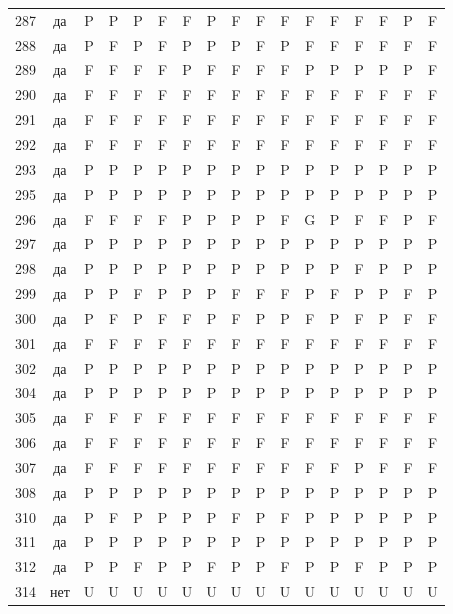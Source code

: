 \begin{table}[p]
\begin{tabular*}{\textwidth}{@{\extracolsep{\fill}}rcccccccccccccccc}
287 & да & P & P & P & F & F & P & F & F & F & F & F & F & F & P & F\\
288 & да & P & F & P & F & P & P & P & F & P & F & F & F & F & F & F\\
289 & да & F & F & F & F & P & F & F & F & F & P & P & P & P & P & F\\
290 & да & F & F & F & F & F & F & F & F & F & F & F & F & F & F & F\\
291 & да & F & F & F & F & F & F & F & F & F & F & F & F & F & F & F\\
292 & да & F & F & F & F & F & F & F & F & F & F & F & F & F & F & F\\
293 & да & P & P & P & P & P & P & P & P & P & P & P & P & P & P & P\\
295 & да & P & P & P & P & P & P & P & P & P & P & P & P & P & P & P\\
296 & да & F & F & F & F & P & P & P & P & F & G & P & F & F & P & F\\
297 & да & P & P & P & P & P & P & P & P & P & P & P & P & P & P & P\\
298 & да & P & P & P & P & P & P & P & P & P & P & P & F & P & P & P\\
299 & да & P & P & F & P & P & P & F & F & F & P & F & P & P & F & P\\
300 & да & P & F & P & F & F & P & F & P & P & F & P & F & P & F & F\\
301 & да & F & F & F & F & F & F & F & F & F & F & F & F & F & F & F\\
302 & да & P & P & P & P & P & P & P & P & P & P & P & P & P & P & P\\
304 & да & P & P & P & P & P & P & P & P & P & P & P & P & P & P & P\\
305 & да & F & F & F & F & F & F & F & F & F & F & F & F & F & F & F\\
306 & да & F & F & F & F & F & F & F & F & F & F & F & F & F & F & F\\
307 & да & F & F & F & F & F & F & F & F & F & F & F & P & F & F & F\\
308 & да & P & P & P & P & P & P & P & P & P & P & P & P & P & P & P\\
310 & да & P & F & P & P & P & P & F & P & F & P & P & P & P & P & P\\
311 & да & P & P & P & P & P & P & P & P & P & P & P & P & P & P & P\\
312 & да & P & P & F & P & P & F & P & P & F & P & P & F & P & P & P\\
314 & нет & U & U & U & U & U & U & U & U & U & U & U & U & U & U & U\\
\bottomrule\end{tabular*}\end{table}
\clearpage

